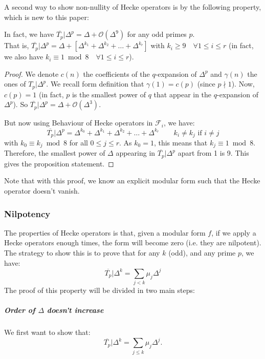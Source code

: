 A second way to show non-nullity of Hecke operators is by the following property, which is new to this paper:
\begin{property}
	In fact, we have $\overline{T_p}|\Delta^p = \Delta + \mathcal{O}(\Delta^9)$ for any odd primes $p$.\\
	That is, $\overline{T_p}|\Delta^p = \Delta + \left[ \Delta^{k_1} + \Delta^{k_2} + \dots + \Delta^{k_r} \right] $ with $k_i \geq 9 \quad \forall 1 \leq i \leq r$ (in fact, we also have $k_i \equiv 1 \bmod 8 \quad \forall 1 \leq i \leq r$).
\end{property}
\begin{proof}
	We denote $c(n)$ the coefficients of the $q$-expansion of $\Delta^p$ and $\gamma(n)$ the ones of $T_p|\Delta^p$.
	We recall form definition that $\gamma(1)=c(p)$ (since $p \nmid 1$).
	Now, $c(p)=1$ (in fact, $p$ is the smallest power of $q$ that appear in the $q$-expansion of $\Delta^p$).
	So $\overline{T_p}|\Delta^p = \Delta + \mathcal{O}(\Delta^3)$.
	
	But now using Behaviour of Hecke operators in $\mathcal{F}_i$, we have:
	$$
	\overline{T_p}|\Delta^p = \Delta^{k_0} + \Delta^{k_1} + \Delta^{k_2} + \dots + \Delta^{k_r} \qquad k_i \neq k_j \text{ if } i \neq j
	$$
	with $k_0 \equiv k_j \bmod 8$ for all $0 \leq j \leq r$.
	As $k_0=1$, this means that $k_j \equiv 1 \bmod 8$.
	Therefore, the smallest power of $\Delta$ appearing in $\overline{T_p}|\Delta^p$ apart from 1 is 9.
	This gives the proposition statement.
\end{proof}
Note that with this proof, we know an explicit modular form such that the Hecke operator doesn't vanish.



\subsubsection{Nilpotency}
\label{NilpotencyHeckeOperators}
The properties of Hecke operators is that, given a modular form $f$, if we apply a Hecke operators enough times, the form will become zero (i.e. they are nilpotent).
The strategy to show this is to prove that for any $k$ (odd), and any prime $p$, we have:
$$
\overline{T_p}| \Delta^k = \sum_{j < k} \mu_j \Delta^j
$$
The proof of this property will be divided in two main steps:

\subparagraph{Order of $\Delta$ doesn't increase}
We first want to show that:
$$
\overline{T_p}| \Delta^k = \sum_{j \leq k} \mu_j \Delta^j.
$$

